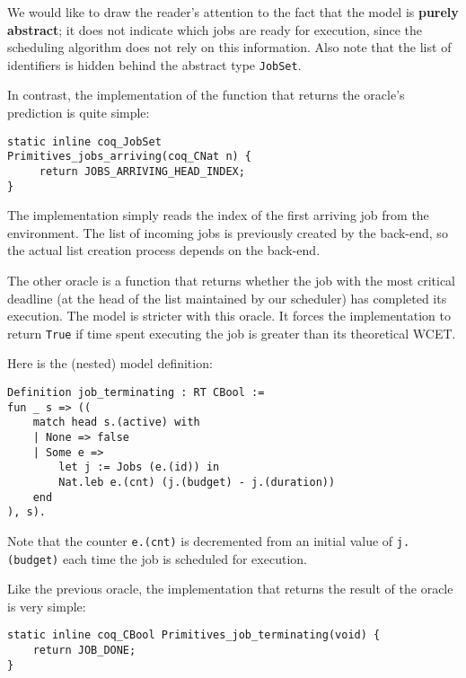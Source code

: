 	We would like to draw the reader's attention to the fact that the model is \textbf{purely abstract}; it does not indicate which jobs are ready for execution, since the scheduling algorithm does not rely on this information. Also note that the list of identifiers is hidden behind the abstract type \texttt{JobSet}.

	In contrast, the implementation of the function that returns the oracle's prediction is quite simple:

	\begin{verbatim}
static inline coq_JobSet
Primitives_jobs_arriving(coq_CNat n) {
     return JOBS_ARRIVING_HEAD_INDEX;
}
	\end{verbatim}

	The implementation simply reads the index of the first arriving job from the environment. The list of incoming jobs is previously created by the back-end, so the actual list creation process depends on the back-end.

	The other oracle is a function that returns whether the job with the most critical deadline (at the head of the list maintained by our scheduler) has completed its execution. The model is stricter with this oracle. It forces the implementation to return \texttt{True} if time spent executing the job is greater than its theoretical WCET.

	\vspace{1cm}

	Here is the (nested) model definition:

	\begin{verbatim}
Definition job_terminating : RT CBool :=
fun _ s => ((
    match head s.(active) with
    | None => false
    | Some e =>
        let j := Jobs (e.(id)) in
        Nat.leb e.(cnt) (j.(budget) - j.(duration))
    end
), s).
	\end{verbatim}

	Note that the counter \texttt{e.(cnt)} is decremented from an initial value of \texttt{j.(budget)} each time the job is scheduled for execution. 

	Like the previous oracle, the implementation that returns the result of the oracle is very simple:

	\begin{verbatim}
static inline coq_CBool Primitives_job_terminating(void) {
    return JOB_DONE;
}
	\end{verbatim}


